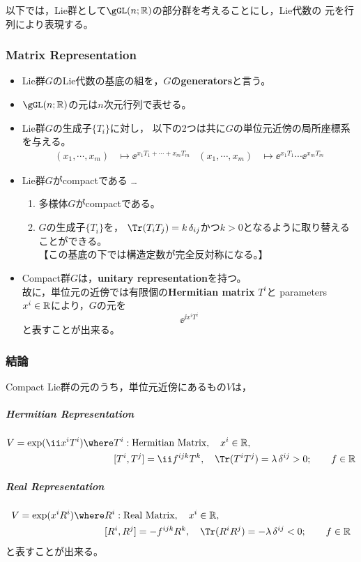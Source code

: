 以下では，Lie群として$\gGL(n;\Real)$の部分群を考えることにし，Lie代数の
元を行列により表現する。

\subsubsection{Matrix Representation}
\begin{itemize}
 \item Lie群$G$のLie代数の基底の組を，$G$の{\bf generators}と言う。
 \item $\gGL(n;\Real)$の元は$n$次元行列で表せる。
 \item Lie群$G$の生成子$\{T_i\}$に対し，
       以下の2つは共に$G$の単位元近傍の局所座標系を与える。
\begin{align}
 (x_1,\cdots,x_m)&\mapsto\ee^{x_1T_1+\cdots+x_mT_m}&
(x_1,\cdots,x_m)&\mapsto\ee^{x_1T_1}\cdots\ee^{x_mT_m}
\end{align}
\end{itemize}

\begin{itemize}
 \item Lie群$G$がcompactである …
\begin{enumerate}
 \item 多様体$G$がcompactである。       
 \item $G$の生成子$\{T_i\}$を，
       $\Tr(T_iT_j)=k\,\delta_{ij}$かつ$k>0$となるように取り替える
       ことができる。\\【この基底の下では構造定数が完全反対称になる。】
\end{enumerate}
 \item Compact群$G$は，{\bf unitary representation}を持つ。\\
       故に，単位元の近傍では有限個の{\bf Hermitian matrix} $T^i$と
       parameters $x^i\in\mathbb R$により，$G$の元を
       \begin{equation}
        \ee^{\ii x^iT^i}
       \end{equation}
       と表すことが出来る。
\end{itemize}
\subsubsection{結論}
Compact Lie群の元のうち，単位元近傍にあるもの$V$は，
\subparagraph{Hermitian Representation}
\begin{align*}
 V=\exp(\ii x^iT^i)
 \where
& T^i:\text{Hermitian Matrix},\quad x^i\in\Real,\\
&[T^i,T^j]=\ii f^{ijk}T^k,\quad \Tr(T^iT^j)=\lambda\,\delta^{ij}>0;\qquad f\in\Real
\end{align*}
\subparagraph{Real Representation}
\begin{align*}
 V=\exp(x^iR^i)
 \where
& R^i:\text{Real Matrix},\quad x^i\in\Real,\\
&[R^i,R^j]=-f^{ijk}R^k,\quad \Tr(R^iR^j)=-\lambda\,\delta^{ij}<0;\qquad f\in\Real
\end{align*}
と表すことが出来る。

